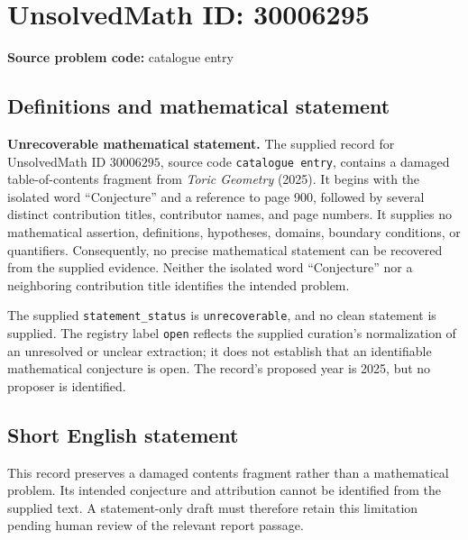 \documentclass[11pt]{article}
\begin{document}
\section*{UnsolvedMath ID: 30006295}
\textbf{Source problem code:} catalogue entry
\subsection{Definitions and mathematical statement}
\textbf{Unrecoverable mathematical statement.} The supplied record for UnsolvedMath ID \(30006295\), source code \texttt{catalogue entry}, contains a damaged table-of-contents fragment from \emph{Toric Geometry} (2025). It begins with the isolated word ``Conjecture'' and a reference to page 900, followed by several distinct contribution titles, contributor names, and page numbers. It supplies no mathematical assertion, definitions, hypotheses, domains, boundary conditions, or quantifiers. Consequently, no precise mathematical statement can be recovered from the supplied evidence. Neither the isolated word ``Conjecture'' nor a neighboring contribution title identifies the intended problem.

The supplied \texttt{statement\_status} is \texttt{unrecoverable}, and no clean statement is supplied. The registry label \texttt{open} reflects the supplied curation's normalization of an unresolved or unclear extraction; it does not establish that an identifiable mathematical conjecture is open. The record's proposed year is 2025, but no proposer is identified.
\subsection{Short English statement}
This record preserves a damaged contents fragment rather than a mathematical problem. Its intended conjecture and attribution cannot be identified from the supplied text. A statement-only draft must therefore retain this limitation pending human review of the relevant report passage.
\end{document}
